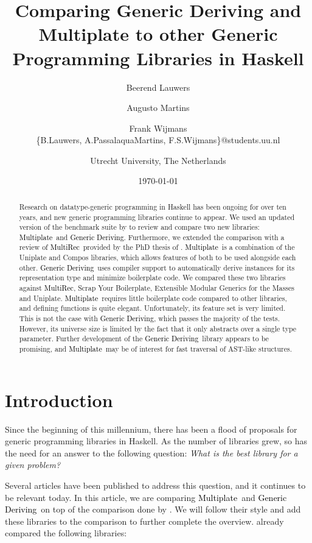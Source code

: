 \documentclass[twocolumn,11pt,a4paper]{article}
\title{Comparing \textbf{Generic Deriving} and \textbf{Multiplate} to other Generic Programming Libraries in Haskell}
\author{
	Beerend Lauwers \and Augusto Martins \and Frank Wijmans\\
	\{B.Lauwers, A.PassalaquaMartins, F.S.Wijmans\}@students.uu.nl\\
	\and
	Utrecht University, The Netherlands}
\date{\today}
\newcommand{\multiplate}{\textcolor{black}{Multiplate}}
\newcommand{\genericderiving}{\textcolor{black}{Generic Deriving}}
\newcommand{\multirec}{\textcolor{black}{MultiRec}}
\begin{document}
\maketitle

\begin{abstract}
Research on datatype-generic programming in Haskell has been ongoing for over ten years, and new generic programming libraries continue to appear.
We used an updated version of the benchmark suite by \citeauthor{Rodriguez:2008:art} to review and compare two new libraries: \multiplate\ and \genericderiving.
Furthermore, we extended the comparison with a review of \multirec\ provided by the PhD thesis of  \citeauthor{Rodriguez:2009:phd}.
\multiplate\ is a combination of the Uniplate and Compos libraries, which allows features of both to be used alongside each other.
\genericderiving\ uses compiler support to automatically derive instances for its representation type and minimize boilerplate code.
We compared these two libraries against \multirec, Scrap Your Boilerplate, Extensible Modular Generics for the Masses and Uniplate.
\multiplate\ requires little boilerplate code compared to other libraries, and defining functions is quite elegant.
Unfortunately, its feature set is very limited. 
This is not the case with \genericderiving, which passes the majority of the tests.
However, its universe size is limited by the fact that it only abstracts over a single type parameter.
Further development of the \genericderiving\ library appears to be promising, and \multiplate\ may be of interest for fast traversal of AST-like structures.

\end{abstract}

\section{Introduction}
Since the beginning of this millennium, there has been a flood of proposals for generic programming libraries in Haskell.
As the number of libraries grew, so has the need for an answer to the following question: 
\textit{What is the best library for a given problem?}

Several articles have been published to address this question, and it continues to be relevant today. 
In this article, we are comparing \multiplate\ and \genericderiving\ on top of the comparison done by \citet{Rodriguez:2008:tr}.
We will follow their style and add these libraries to the comparison to further complete the overview. 
\citet{Rodriguez:2008:tr} already compared the following libraries:
\end{document}
